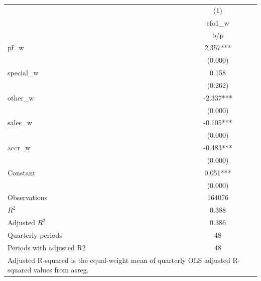 {
\def\sym#1{\ifmmode^{#1}\else\(^{#1}\)\fi}
\begin{tabular}{l*{1}{c}}
\hline\hline
                    &\multicolumn{1}{c}{(1)}\\
                    &\multicolumn{1}{c}{cfo1\_w}\\
                    &         b/p   \\
\hline
pf\_w                &       2.357***\\
                    &     (0.000)   \\
special\_w           &       0.158   \\
                    &     (0.262)   \\
other\_w             &      -2.337***\\
                    &     (0.000)   \\
sales\_w             &      -0.105***\\
                    &     (0.000)   \\
accr\_w              &      -0.483***\\
                    &     (0.000)   \\
Constant            &       0.051***\\
                    &     (0.000)   \\
\hline
Observations        &      164076   \\
\(R^{2}\)           &       0.388   \\
Adjusted \(R^{2}\)  &       0.386   \\
Quarterly periods   &          48   \\
Periods with adjusted R2&          48   \\
\hline\hline
\multicolumn{2}{l}{\footnotesize Adjusted R-squared is the equal-weight mean of quarterly OLS adjusted R-squared values from asreg.}\\
\end{tabular}
}
